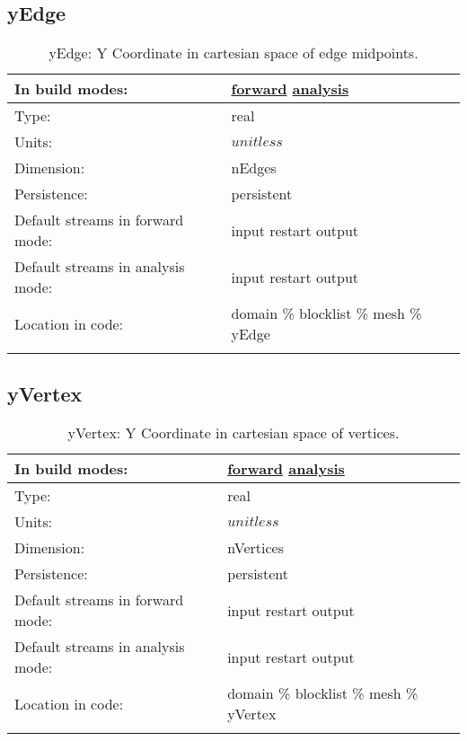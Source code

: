 \subsection[yEdge]{yEdge}
\label{subsec:var_sec_mesh_yEdge}
\begin{center}
\begin{longtable}{| p{2.0in} | p{4.0in} |}
        \hline 
        In build modes: & \hyperref[subsec:forward_var_tab_mesh]{forward} \hyperref[subsec:analysis_var_tab_mesh]{analysis} \\
        \hline 
        Type: & real \\
        \hline 
        Units: & $unitless$ \\
        \hline 
        Dimension: & nEdges \\
        \hline 
        Persistence: & persistent \\
        \hline 
		 Default streams in forward mode: &  input restart output \\
        \hline 
		 Default streams in analysis mode: &  input restart output \\
        \hline 
		 Location in code: & domain \% blocklist \% mesh \% yEdge \\
		 \hline 
    \caption{yEdge: Y Coordinate in cartesian space of edge midpoints.}
\end{longtable}
\end{center}
\subsection[yVertex]{yVertex}
\label{subsec:var_sec_mesh_yVertex}
\begin{center}
\begin{longtable}{| p{2.0in} | p{4.0in} |}
        \hline 
        In build modes: & \hyperref[subsec:forward_var_tab_mesh]{forward} \hyperref[subsec:analysis_var_tab_mesh]{analysis} \\
        \hline 
        Type: & real \\
        \hline 
        Units: & $unitless$ \\
        \hline 
        Dimension: & nVertices \\
        \hline 
        Persistence: & persistent \\
        \hline 
		 Default streams in forward mode: &  input restart output \\
        \hline 
		 Default streams in analysis mode: &  input restart output \\
        \hline 
		 Location in code: & domain \% blocklist \% mesh \% yVertex \\
		 \hline 
    \caption{yVertex: Y Coordinate in cartesian space of vertices.}
\end{longtable}
\end{center}
